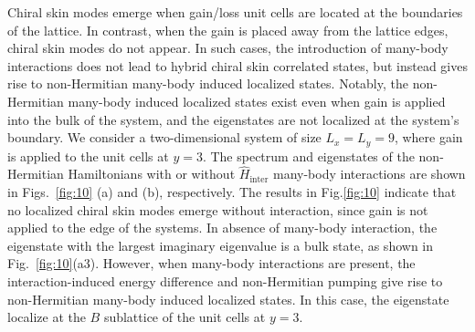 \documentclass[longbibliography, aps, prx, amsmath, amssymb, amsfonts, twocolumn,superscriptaddress, footinbib]{revtex4-1}
\begin{document}
	Chiral skin modes emerge when gain/loss unit cells are located at the boundaries of the lattice. 
	In contrast, when the gain is placed away from the lattice edges, chiral skin modes do not appear. In such cases, the introduction of many-body interactions does not lead to hybrid chiral skin correlated states, but instead gives rise to non-Hermitian many-body induced localized states. 
	Notably, the non-Hermitian many-body induced localized states exist even when gain is applied into the bulk of the system, and the eigenstates are not localized at the system's boundary.
	We consider a two-dimensional system of size $L_x = L_y = 9$, where gain is applied to the unit cells at $y = 3$. 
	The spectrum and eigenstates of the non-Hermitian Hamiltonians with or without $\hat{H}_{\text{inter}}$ many-body interactions are shown in Figs.~\ref{fig:10} (a) and (b), respectively. 
	The results in Fig.\ref{fig:10} indicate that no localized chiral skin modes emerge without interaction, since gain is not applied to the edge of the systems. 
	In absence of many-body interaction, the eigenstate with the largest imaginary eigenvalue is a bulk state, as shown in Fig.~\ref{fig:10}(a3). However, when many-body interactions are present, the interaction-induced energy difference and non-Hermitian pumping give rise to non-Hermitian many-body induced localized states. In this case, the eigenstate localize at the $B$ sublattice of the unit cells at $y = 3$.
\end{document}
